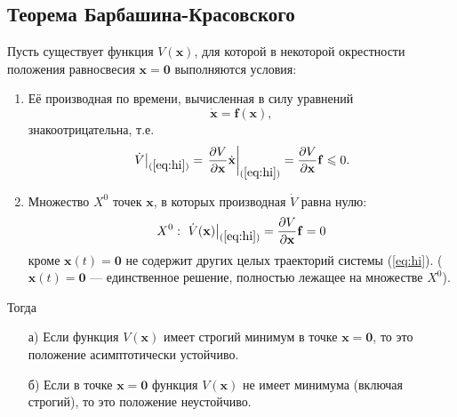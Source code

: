 \documentclass[a4paper]{article}
\begin{document}
\subsection{Теорема Барбашина-Красовского}
\begin{thm}
	Пусть существует функция $V(\mathbf{x})$, для которой в некоторой окрестности
	положения равносвесия $\mathbf{x}=\mathbf{0}$ выполняются условия:
	\begin{enumerate}
		\item Её производная по времени, вычисленная в силу уравнений
			\[
				\dot{\mathbf{x}}=\mathbf{f}(\mathbf{x}) \tag{*}
				\label{eq:hi}
			,\]
		знакоотрицательна, т.\:е.
		\[
			\left. \dot{V}  \right|_{(\ref{eq:hi})}=
			\left.\frac{\partial V}{\partial \mathbf{x}} \dot{\mathbf{x}}
			\right|_{(\ref{eq:hi})}=\frac{\partial V}{\partial  \mathbf{x}}
			\mathbf{f}\le 0
		.\]
		\item Множество $X^0$ точек  $\mathbf{x}$, в которых
			производная $\dot{V}$ равна нулю:
 \[
	 X^0:\: \left.\dot{V}(\mathbf{x})\right|_{(\ref{eq:hi})}=
		 \frac{\partial V}{\partial \mathbf{x}}\mathbf{f}=0 
 \]
 кроме $\mathbf{x}(t)=\mathbf{0}$ не содержит других целых траекторий системы
 (\ref{eq:hi}). ($\mathbf{x}(t)=\mathbf{0}$ --- единственное решение, полностью
 лежащее на множестве $X^0$).
	\end{enumerate}
	Тогда
	\begin{itemize}
		\item[а)] Если функция $V(\mathbf{x})$ имеет строгий минимум в
			точке $\mathbf{x}=\mathbf{0}$, то это положение
			асимптотически устойчиво.
		\item[б)] Если в точке $\mathbf{x}=\mathbf{0}$ функция
				$V(\mathbf{x})$ не имеет минимума (включая
				строгий), то это положение неустойчиво.
	\end{itemize}
\end{thm}
\end{document}
